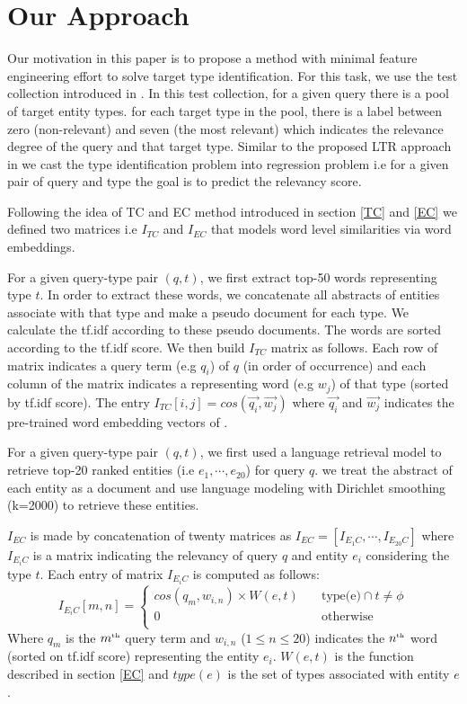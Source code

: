 \section{Our Approach}
Our motivation in this paper is to propose a method with minimal feature engineering effort to solve target type identification. For this task, we use the test collection introduced in \cite{Garigliotti:2017:TTI:3077136.3080659}. In this test collection, for a given query there is a pool of target entity types. for each target type in the pool, there is a label between zero (non-relevant) and seven (the most relevant) which indicates the relevance degree of the query and that target type. Similar to the proposed LTR approach in \cite{Garigliotti:2017:TTI:3077136.3080659} we cast the type identification problem into regression problem i.e for a given pair of query and type the goal is to predict the relevancy score.

Following the idea of TC and EC method introduced in section \ref{TC} and \ref{EC} we defined two matrices i.e $I_{TC}$ and $I_{EC}$ that models word level similarities via word embeddings. 

 For a given query-type pair $(q,t)$, we first extract top-50 words representing type $t$. In order to extract these words, we concatenate all abstracts of entities associate with that type and make a pseudo document for each type. We calculate the tf.idf according to these pseudo documents. The words are sorted according to the tf.idf score. We then build $I_{TC}$ matrix as follows. Each row of matrix indicates a query term (e.g $q_i$) of $q$ (in order of occurrence) and each column of the matrix indicates a representing word (e.g $w_j$) of that type (sorted by tf.idf score). The entry $I_{TC}[i,j] = cos(\vec{q_i}, \vec{w_j})$ where $\vec{q_i}$ and $\vec{w_j}$ indicates the pre-trained word embedding vectors of \cite{Mikolov:2013:DRW:2999792.2999959}.

 For a given query-type pair $(q,t)$, we first used a language retrieval model to retrieve top-20 ranked entities (i.e $e_1,\cdots, e_{20}$) for query $q$.
we treat the abstract of each entity as a document and use language modeling with Dirichlet smoothing (k=2000) to retrieve these entities.

$I_{EC}$ is made by concatenation of twenty matrices as $I_{EC} = [I_{E_1C},\cdots, I_{E_{20}C}]$ where $I_{E_iC}$ is a matrix indicating the relevancy of query $q$ and entity $e_i$ considering the type $t$. Each entry of matrix $I_{E_iC}$ is computed as follows:
\begin{equation}
I_{E_iC}[m,n] = 
\begin{cases}
cos(q_m,w_{i,n}) \times W(e,t) &\quad\text{type(e)} \cap t \neq \phi \\
0 &\quad\text{otherwise} \\
\end{cases}
\end{equation}
Where $q_m$ is the $m^{\text{\tiny th}}$ query term and $w_{i,n}$ ($1\leq n \leq20$) indicates the $n^{\text{\tiny th}}$ word (sorted on tf.idf score) representing the entity $e_i$. $W(e,t)$ is the function  described in section \ref{EC} and $type(e)$ is the set of types associated with entity $e$.


